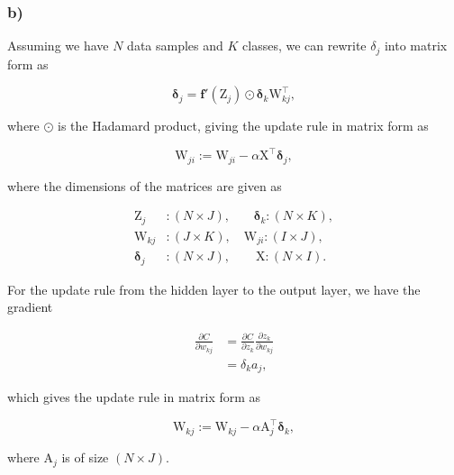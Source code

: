 \subsubsection*{b)}

Assuming we have $N$ data samples and $K$ classes, we can rewrite $\delta_j$ into matrix form as

\begin{equation*}
  \bm{\delta}_j = \bm{f}'(\bm{\mathrm{Z}}_j) \odot \bm{\delta}_k \bm{\mathrm{W}}_{kj}^{\top},
\end{equation*}

where $\odot$ is the Hadamard product, giving the update rule in matrix form as

\begin{equation*}
  \bm{\mathrm{W}}_{ji} := \bm{\mathrm{W}}_{ji} - \alpha \bm{\mathrm{X}}^\top \bm{\delta}_j,
\end{equation*}

where the dimensions of the matrices are given as

\begin{align*}
  \bm{\mathrm{Z}}_j &: (N \times J), \quad\,\,\,\,\, \bm{\delta}_k : (N \times K), \\ 
  \bm{\mathrm{W}}_{kj} &: (J \times K), \quad \bm{\mathrm{W}}_{ji} : (I \times J), \\
  \bm{\delta}_j &: (N \times J), \quad\,\,\,\,\,\, \bm{\mathrm{X}} : (N \times I).
\end{align*}

For the update rule from the hidden layer to the output layer, we have the gradient

\begin{align*}
    \frac{\partial C}{\partial w_{kj}}&= \frac{\partial C}{\partial z_k} \frac{\partial z_k}{\partial w_{kj}} \\
                                      &= \delta_k a_j,
\end{align*}

which gives the update rule in matrix form as

\begin{equation*}
  \bm{\mathrm{W}}_{kj} := \bm{\mathrm{W}}_{kj} - \alpha \bm{\mathrm{A}}_j^\top \bm{\delta}_k,
\end{equation*}

where $\bm{\mathrm{A}}_j$ is of size $(N \times J)$.
